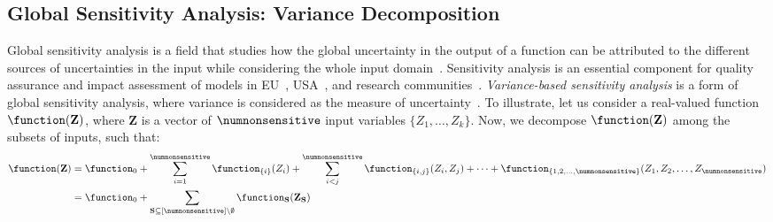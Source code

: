 \subsection{Global Sensitivity Analysis: Variance Decomposition}
Global sensitivity analysis is a field that studies how the global uncertainty in the output of a function can be attributed to the different sources of uncertainties in the input while considering the whole input domain~\cite{saltelli2008global}.
Sensitivity analysis is an essential component for quality assurance and impact assessment of models in EU~\cite{eu}, USA~\cite{usepa}, and research communities~\cite{saltelli2020five}.
\emph{Variance-based sensitivity analysis} is a form of global sensitivity analysis, where variance is considered as the measure of uncertainty~\cite{sobol1990sensitivity,sobol2001global}. To illustrate, let us consider a real-valued function $  \function(\mathbf{Z}) $, where $ \mathbf{Z} $ is a vector of $ \numnonsensitive $ input variables $ \{Z_1, \dots, Z_k\} $.
Now, we decompose $ \function(\mathbf{Z}) $ among the subsets of inputs, such that:
\begin{align}
	\function(\mathbf{Z}) &= \function_0 + \sum_{i=1}^{\numnonsensitive} \function_{\{i\}}(Z_i) +  \sum_{i < j}^{\numnonsensitive} \function_{\{i,j\}}(Z_i, Z_j)  + \cdots  + \function_{\{1, 2, \dots, \numnonsensitive\}} (Z_1, Z_2, \dots, Z_{\numnonsensitive})\notag%
	\\    
	&= \function_0 +  \sum_{\mathbf{S} \subseteq [\numnonsensitive] \setminus \emptyset} \function_{\mathbf{S}}(\mathbf{Z}_{\mathbf{S}})\label{eq:functional_decomposition_set_notation}
\end{align}

